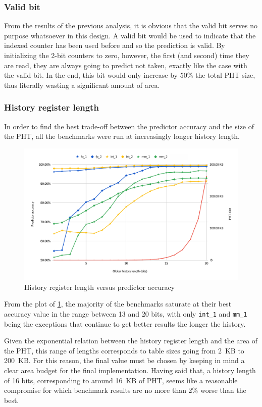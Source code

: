 \subsubsection{Valid bit}
From the results of the previous analysis, it is obvious that the valid bit serves no purpose whatsoever in this design. A valid bit would be used to indicate that the indexed counter has been used before and so the prediction is valid. By initializing the 2-bit counters to zero, however, the first (and second) time they are read, they are always going to predict not taken, exactly like the case with the valid bit. In the end, this bit would only increase by 50\% the total \ac{PHT} size, thus literally wasting a significant amount of area.

\subsubsection{History register length}
In order to find the best trade-off between the predictor accuracy and the size of the \ac{PHT}, all the benchmarks were run at increasingly longer history length.
\begin{figure}[hbt]
  \centering
  \includegraphics[width=\textwidth]{img/pht_size.pdf}
  \caption{History register length versus predictor accuracy}
  \label{fig:pht_size}
\end{figure}

From the plot of \cref{fig:pht_size}, the majority of the benchmarks saturate at their best accuracy value in the range between 13 and 20 bits, with only \texttt{int\_1} and \texttt{mm\_1} being the exceptions that continue to get better results the longer the history. 

Given the exponential relation between the history register length and the area of the \ac{PHT}, this range of lengths corresponds to table sizes going from \SI{2}{KB} to \SI{200}{KB}. For this reason, the final value must be chosen by keeping in mind a clear area budget for the final implementation. Having said that, a history length of 16 bits, corresponding to around \SI{16}{KB} of \ac{PHT}, seems like a reasonable compromise for which benchmark results are no more than 2\% worse than the best.

